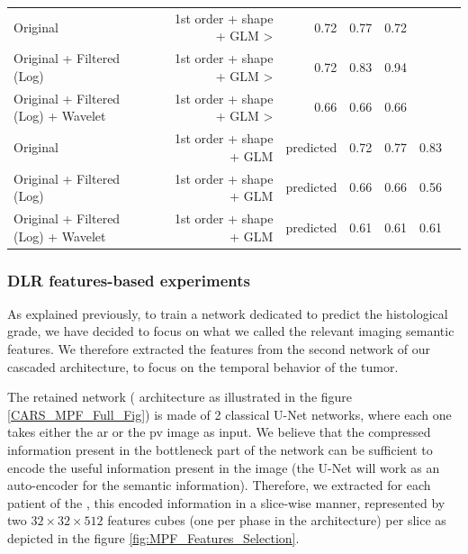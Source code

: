 {\begin{table}[!htp]
\begin{tabular}{lrrrrrr}
Original &1st order + shape + GLM > &0.72 &0.77 &0.72 \\
Original + Filtered (Log) &1st order + shape + GLM > &0.72 &0.83 &0.94 \\
Original + Filtered (Log) + Wavelet &1st order + shape + GLM > &0.66 &0.66 &0.66 \\
Original &1st order + shape + GLM &predicted &0.72 &0.77 &0.83 \\
Original + Filtered (Log) &1st order + shape + GLM &predicted &0.66 &0.66 &0.56 \\
Original + Filtered (Log) + Wavelet &1st order + shape + GLM &predicted &0.61 &0.61 &0.61 \\
\bottomrule
\end{tabular}
\end{table}
}

\subsubsection{DLR features-based experiments}

As explained previously, to train a network dedicated to predict the
histological grade, we have decided to focus on what we called the
relevant imaging semantic features.
We therefore extracted the features from the second network of our
cascaded architecture, to focus on the temporal behavior of the tumor.

The retained network ( architecture as illustrated in the figure \ref{CARS_MPF_Full_Fig}) is made of 2 classical U-Net networks, where each
one takes either the \ac{ar} or the \ac{pv} image as input. We believe
that the compressed information present in the bottleneck part of the
network can be sufficient to encode the useful information present in the
image (the U-Net will work as an auto-encoder for the semantic information). Therefore, we extracted for each patient of the \textbf{}, this
encoded information in a slice-wise manner, represented by two $ 32\times32\times512 $
features cubes (one per phase in the  architecture) per slice
as depicted in the figure \ref{fig:MPF_Features_Selection}.


